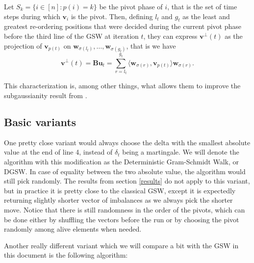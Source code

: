 \documentclass[12pt]{article}
\begin{document}
Let $S_{k}=\{i\in[n]:p(i)=k\}$ be the pivot phase of $i$, that is the set of time steps during which $\textbf{v}_i$ is the pivot. Then, defining $l_t$ and $g_t$ as the least and greatest re-ordering positions that were decided during the current pivot phase before the third line of the GSW at iteration $t$, they can express $\textbf{v}^\perp (t)$ as the projection of $\textbf{v}_{p(t)}$ on $\textbf{w}_{\sigma(l_t)},\dots,\textbf{w}_{\sigma(g_t)}$, that is we have $$\textbf{v}^\perp (t)=\textbf{Bu}_t=\sum_{r=l_t}^{g_t}\langle\textbf{w}_{\sigma(r)},\textbf{v}_{p(t)}\rangle\textbf{w}_{\sigma(r)}.$$

This characterization is, among other things, what allows them to improve the subgaussianity result from \cite{blues}.


\subsection{Basic variants}\label{basic_variants}
One pretty close variant would always choose the delta with the smallest absolute value at the end of line 4, instead of $\delta_t$ being a martingale. We will denote the algorithm with this modification as the Deterministic Gram-Schmidt Walk, or DGSW. In case of equality between the two absolute value, the algorithm would still pick randomly. The results from section \ref{results} do not apply to this variant, but in practice it is pretty close to the classical GSW, except it is expectedly returning slightly shorter vector of imbalances as we always pick the shorter move. Notice that there is still randomness in the order of the pivots, which can be done either by shuffling the vectors before the run or by choosing the pivot randomly among alive elements when needed.

Another really different variant which we will compare a bit with the GSW in this document is the following algorithm:
\end{document}

